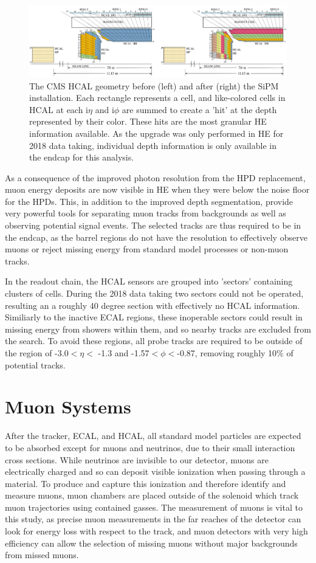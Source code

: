 \begin{figure}[!htpb]
	   \centering
	      \includegraphics[width=\textwidth]{figures/HE_upgrade.jpg}
		 \caption[The 2018 HE upgrade]{The CMS HCAL geometry before (left) and after (right) the SiPM installation. Each rectangle represents a cell, and like-colored cells in HCAL at each i$\eta$ and i$\phi$ are summed to create a 'hit' at the depth represented by their color. These hits are the most granular HE information available. As the upgrade was only performed in HE for 2018 data taking, individual depth information is only available in the endcap for this analysis.}
	    \label{fig:HElayout}
\end{figure}

As a consequence of the improved photon resolution from the HPD replacement, muon energy deposits are now visible in HE when they were below the noise floor for the HPDs. 
This, in addition to the improved depth segmentation, provide very powerful tools for separating muon tracks from backgrounds as well as observing potential signal events.
The selected tracks are thus required to be in the endcap, as the barrel regions do not have the resolution to effectively observe muons or reject missing energy from standard model processes or non-muon tracks.

In the readout chain, the HCAL sensors are grouped into 'sectors' containing clusters of cells. During the 2018 data taking two sectors could not be operated, resulting an a roughly 40 degree section with effectively no HCAL information. Similiarly to the inactive ECAL regions, these inoperable sectors could result in missing energy from showers within them, and so nearby tracks are excluded from the search. 
To avoid these regions, all probe tracks are required to be outside of the region of -3.0$<\eta<$ -1.3 and -1.57$<\phi<$-0.87, removing roughly 10$\%$ of potential tracks.

\section{Muon Systems}
After the tracker, ECAL, and HCAL, all standard model particles are expected to be absorbed except for muons and neutrinos, due to their small interaction cross sections.
While neutrinos are invisible to our detector, muons are electrically charged and so can deposit visible ionization when passing through a material.
To produce and capture this ionization and therefore identify and measure muons, muon chambers are placed outside of the solenoid which track muon trajectories using contained gasses.
The measurement of muons is vital to this study, as precise muon measurements in the far reaches of the detector can look for energy loss with respect to the track, and muon detectors with very high efficiency can allow the selection of missing muons without major backgrounds from missed muons.

